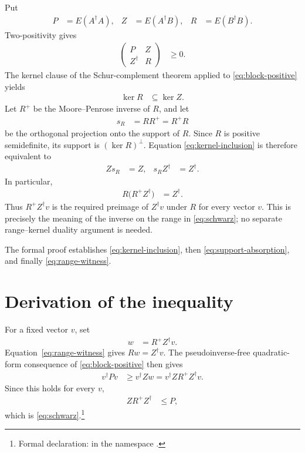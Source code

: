 \documentclass{article}
\begin{document}
Put
\begin{align}
  P &= E(A^\dagger A), &
  Z &= E(A^\dagger B), &
  R &= E(B^\dagger B).
\end{align}
Two-positivity gives
\begin{align}
  \begin{pmatrix}
    P & Z\\
    Z^\dagger & R
  \end{pmatrix}
  &\geq 0.
  \label{eq:block-positive}
\end{align}
The kernel clause of the Schur-complement theorem applied to
\eqref{eq:block-positive} yields
\begin{align}
  \ker R &\subseteq \ker Z.
  \label{eq:kernel-inclusion}
\end{align}
Let $R^+$ be the Moore--Penrose inverse of $R$, and let
\begin{align}
  s_R &= RR^+=R^+R
\end{align}
be the orthogonal projection onto the support of $R$.  Since $R$ is positive
semidefinite, its support is $(\ker R)^\perp$.  Equation
\eqref{eq:kernel-inclusion} is therefore equivalent to
\begin{align}
  Zs_R &= Z,
  &
  s_RZ^\dagger &= Z^\dagger.
  \label{eq:support-absorption}
\end{align}
In particular,
\begin{align}
  R\bigl(R^+Z^\dagger\bigr) &= Z^\dagger.
  \label{eq:range-witness}
\end{align}
Thus $R^+Z^\dagger v$ is the required preimage of $Z^\dagger v$ under $R$
for every vector $v$.  This is precisely the meaning of the inverse on the
range in \eqref{eq:schwarz}; no separate range--kernel duality argument is
needed.

The formal proof establishes \eqref{eq:kernel-inclusion}, then
\eqref{eq:support-absorption}, and finally
\eqref{eq:range-witness}.

\section{Derivation of the inequality}

For a fixed vector $v$, set
\begin{align}
  w &= R^+Z^\dagger v.
\end{align}
Equation~\eqref{eq:range-witness} gives $Rw=Z^\dagger v$.  The
pseudoinverse-free quadratic-form consequence of
\eqref{eq:block-positive} then gives
\begin{align}
  v^\dagger Pv
  &\geq v^\dagger Zw
   = v^\dagger ZR^+Z^\dagger v.
\end{align}
Since this holds for every $v$,
\begin{align}
  ZR^+Z^\dagger &\leq P,
\end{align}
which is \eqref{eq:schwarz}.\footnote{Formal declaration:
   in the namespace
  .}
\end{document}
